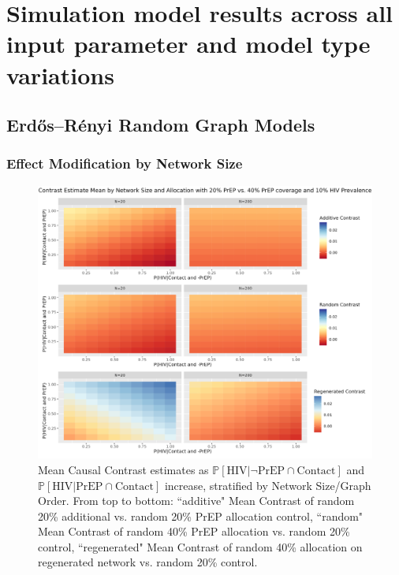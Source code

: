 \documentclass{article}
\theoremstyle{definition}
\begin{document}
\section{\textbf{Simulation model results across all input parameter and model type variations}}
\label{Appendix 5}

\subsection{Erdős–Rényi  Random Graph Models}

\subsubsection{Effect Modification by Network Size}
\begin{figure}[H]
    \centering
    \includegraphics[width=\linewidth]{Corrected Figures/Network Size Mean Plot.png}
    \caption{Mean Causal Contrast estimates as $\mathbb{P}\left[\text{HIV} \vert \neg \text{PrEP} \cap \text{Contact}\right]$ and $\mathbb{P}\left[\text{HIV} \vert \text{PrEP} \cap \text{Contact}\right]$ increase, stratified by Network Size/Graph Order. From top to bottom: ``additive" Mean Contrast of random 20\% additional vs. random 20\% PrEP allocation control, ``random" Mean Contrast of random 40\% PrEP allocation vs. random 20\% control, ``regenerated" Mean Contrast of random 40\% allocation on regenerated network vs. random 20\% control. }
    \label{fig: Figure S4.1}
\end{figure}
\end{document}
